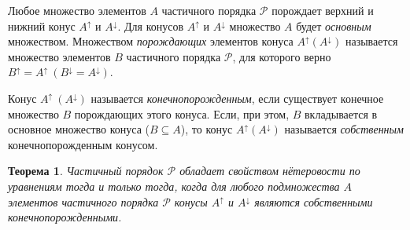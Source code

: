 \documentclass[12pt]{article}
\theoremstyle{break}
\newtheorem{Th}{Теорема}
\def\P{\mathcal{P}}
\begin{document}
		Любое множество элементов $A$ частичного порядка $\P$ порождает верхний и нижний конус $A^{\uparrow}$ и $A^{\downarrow}$. Для конусов $A^{\uparrow}$ и $A^{\downarrow}$ множество $A$ будет \textit{основным} множеством. Множеством \textit{порождающих} элементов конуса $A^{\uparrow}(A^{\downarrow})$ называется множество элементов $B$ частичного порядка $\P$, для которого верно $B^{\uparrow}=A^{\uparrow}~(B^{\downarrow}=A^{\downarrow})$.

		Конус $A^{\uparrow}~(A^{\downarrow})$ называется \textit{конечнопорожденным}, если существует конечное множество $B$ порождающих этого конуса. Если, при этом, $B$ вкладывается в основное множество конуса ($B\subseteq A$), то конус $A^{\uparrow}(A^{\downarrow})$ называется \textit{собственным} конечнопорожденным конусом.

		\begin{Th}\label{criterion}
			Частичный порядок $\P$ обладает свойством нётеровости по уравнениям тогда и только тогда, когда для любого подмножества $A$ элементов частичного порядка $\P$ конусы $A^{\uparrow}$ и $A^{\downarrow}$ являются собственными конечнопорожденными.
		\end{Th}
\end{document}
